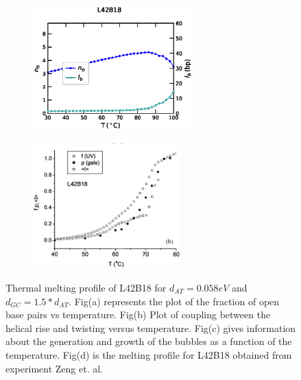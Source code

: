 \documentclass[12pt,masters,final]{UTRGVthesis}
\begin{document}
\begin{figure}[!h]
        \begin{subfigure}[b]{0.49\textwidth}
                \centering
                \includegraphics[height=1.9in, width=.8\textwidth]{L42B18_temp_bub.eps}
                \caption{}
                \label{fig:L42B18bub}
        \end{subfigure}%
        \begin{subfigure}[b]{0.49\textwidth}
                \centering
                \includegraphics[height=1.9in, width=.8\textwidth]{exp_L42B18.eps}
                \caption{}
                \label{fig:L42B18exp}
        \end{subfigure}%
       
       
\caption{Thermal melting profile of L42B18 for $d_{AT}=0.058 eV$ and $d_{GC}=1.5*d_{AT}$. Fig(a) represents the plot of the fraction of open base pairs vs temperature. Fig(b) Plot of coupling between the helical rise and twisting versus temperature. Fig(c) gives information about the generation and growth of the bubbles as a function of the temperature. Fig(d) is the melting profile for L42B18  obtained from experiment Zeng et. al.} 
\label{fig:L42b18cal}    

\end{figure}
%
\newpage
\end{document}
